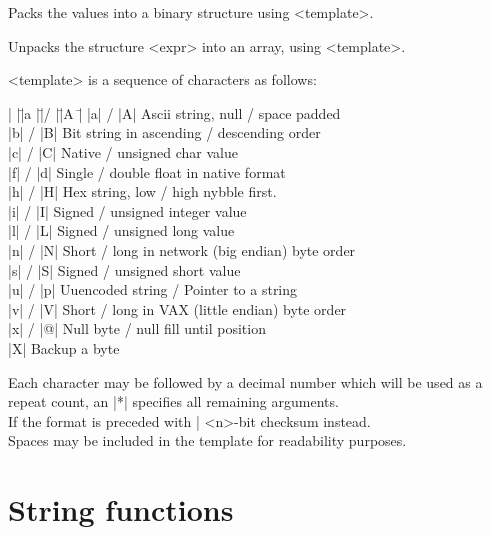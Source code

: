\begin{enum}{1cm}

Packs the values into a binary structure using <template>.

Unpacks the structure <expr> into an array, using <template>.

<template> is a sequence of characters as follows:

\begin{tabbing}
|  |\=|a |\=|/ |\=|A  |\= \kill
  \> |a| \> / \> |A| \> Ascii string, null / space padded \\
  \> |b| \> / \> |B| \> Bit string in ascending / descending order \\
  \> |c| \> / \> |C| \> Native / unsigned char value \\
  \> |f| \> / \> |d| \> Single / double float in native format \\
  \> |h| \> / \> |H| \> Hex string, low / high nybble first. \\
  \> |i| \> / \> |I| \> Signed / unsigned integer value \\
  \> |l| \> / \> |L| \> Signed / unsigned long value \\
  \> |n| \> / \> |N| \> Short / long in network (big endian) byte order \\
  \> |s| \> / \> |S| \> Signed / unsigned short value \\
  \> |u| \> / \> |p| \> Uuencoded string / Pointer to a string \\
  \> |v| \> / \> |V| \> Short / long in VAX (little endian) byte order \\
  \> |x| \> / \> |@| \> Null byte / null fill until position \\
  \> |X| \>   \>     \> Backup a byte
\end{tabbing}

Each character may be followed by a decimal number which will be used
as a repeat count, an |*| specifies all remaining arguments. \\
If the format is preceded with |%
<n>-bit checksum instead. \\
Spaces may be included in the template for readability purposes.

\end{enum}


\section{String functions} 

